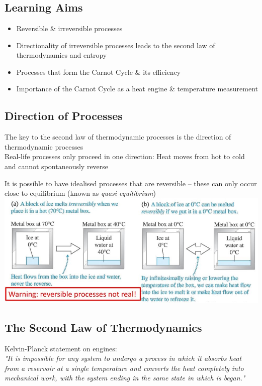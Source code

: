 \documentclass[a4paper, 11pt, fleqn, normalem]{report}
\begin{document}
\chapter{}
\thispagestyle{fancy}
\section{Learning Aims}
\begin{itemize}
	\item Reversible \& irreversible processes
	\item Directionality of irreversible processes leads to the second law of thermodynamics and entropy
	\item Processes that form the Carnot Cycle \& its efficiency
	\item Importance of the Carnot Cycle as a heat engine \& temperature measurement
\end{itemize}

\section{Direction of Processes}
The key to the second law of thermodynamic processes is the direction of thermodynamic processes \\
Real-life processes only proceed in one direction: Heat moves from hot to cold and cannot spontaneously reverse

It is possible to have idealised processes that are reversible -- these can only occur close to equilibrium (known as \emph{quasi-equilibrium}) \\
\includegraphics[scale=0.65]{Icebox.jpg}

\section{The Second Law of Thermodynamics}
Kelvin-Planck statement on engines: \\
\emph{"It is impossible for any system to undergo a process in which it absorbs heat from a reservoir at a single temperature and converts the heat completely into mechanical work, with the system ending in the same state in which is began."}
\end{document}

